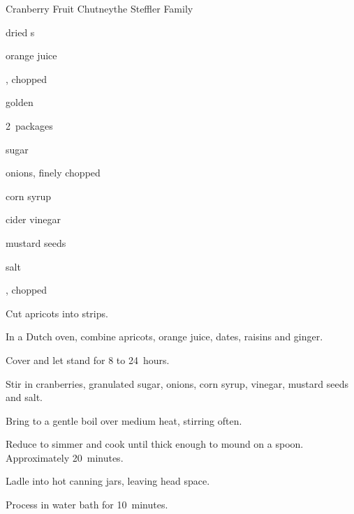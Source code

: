 \begin{recipe}{Cranberry Fruit Chutney}{the Steffler Family}{}

\begin{ingredients}
\item {} dried s
\item \C{2\half} orange juice
\item {} , chopped
\item \C{\half} golden 
\item 2~packages 
\item \C{1\half} sugar
\item \C{1\quarter} onions, finely chopped
\item \C{\threequarter} corn syrup
\item \C{\threequarter} cider vinegar
\item \tp{1\half} mustard seeds
\item \tp{\quarter} salt
\item \C{\half} , chopped
\end{ingredients}

\begin{directions}
\item Cut apricots into \cm{\half} strips.
\item In a Dutch oven, combine apricots, orange juice, dates, raisins and ginger.
\item Cover and let stand for 8 to 24~hours.
\item Stir in cranberries, granulated sugar, onions, corn syrup, vinegar, mustard seeds and salt.
\item Bring to a gentle boil over medium heat, stirring often.
\item Reduce to simmer and cook until thick enough to mound on a spoon. Approximately 20~minutes.
\item Ladle into  hot canning jars, leaving \cm{\half} head space.
\item Process in water bath for 10~minutes.
\end{directions}
\end{recipe}
